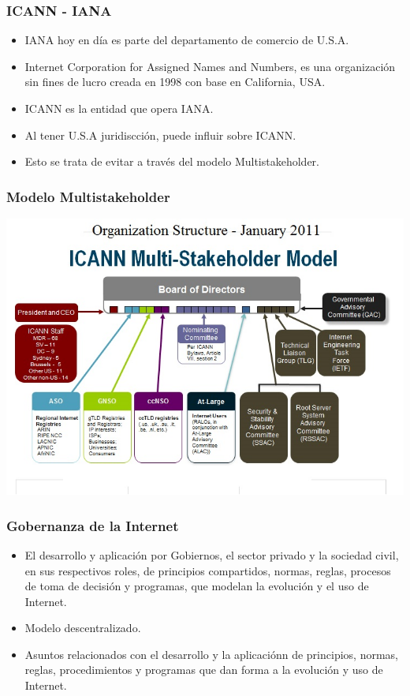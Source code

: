 \documentclass{beamer}
\begin{document}
\begin{frame}
\frametitle{ICANN - IANA}
	\begin{itemize}
		\item \pause IANA hoy en d\'ia es parte del departamento de comercio de U.S.A.
		\item \pause \alert{I}nternet \alert{C}orporation for \alert{A}ssigned \alert{N}ames and \alert{N}umbers, es una organizaci\'on sin fines de lucro creada en 1998 con base en California, USA.
		\item \pause ICANN es la entidad que opera IANA.
		\item \pause Al tener U.S.A juridiscci\'on, puede influir sobre ICANN.
		\item \pause Esto se trata de evitar a trav\'es del modelo Multistakeholder.
	\end{itemize}
\end{frame}

\begin{frame}
\frametitle{Modelo Multistakeholder}
	\begin{center}
		\includegraphics[scale=0.50]{../img/Icann-Organization-Structure-January-2011.jpg}
	\end{center}

\end{frame}

\begin{frame}
\frametitle{Gobernanza de la Internet}
	\begin{itemize}
		\item \pause El desarrollo y aplicaci\'on por Gobiernos, el sector privado y la sociedad civil, en sus respectivos roles, de principios compartidos, normas, reglas, procesos de toma de decisi\'on y programas, que modelan la evoluci\'on y el uso de Internet.
		\item \pause Modelo descentralizado.
		\item \pause Asuntos relacionados con el desarrollo y la aplicaci\'onn de principios, normas, reglas, procedimientos y programas que dan forma a la evoluci\'on y uso de Internet.
     \end{itemize} 
\end{frame}
\end{document}
